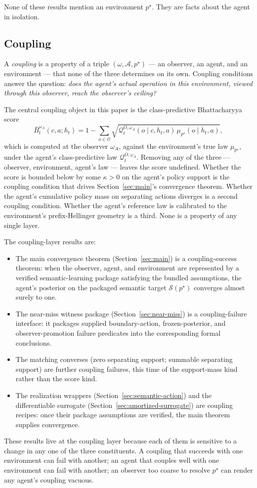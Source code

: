 \documentclass[11pt]{article}
\theoremstyle{definition}
\theoremstyle{remark}
\theoremstyle{plain}
\theoremstyle{definition}
\newcommand{\Acal}{\mathcal{A}}
\newcommand{\Ocal}{\mathcal{O}}
\newcommand{\Qcal}{\mathcal{Q}}
\newcommand{\Scal}{\mathcal{S}}
\begin{document}
None of these results mention an environment $p^\star$. They are facts about the agent in isolation.

\subsection{Coupling}
\label{sec:ontology-coupling}

A \emph{coupling} is a property of a triple $(\omega,\Acal,p^\star)$ --- an observer, an agent, and an environment --- that none of the three determines on its own. Coupling conditions answer the question: \emph{does the agent's actual operation in this environment, viewed through this observer, reach the observer's ceiling?}

The central coupling object in this paper is the class-predictive Bhattacharyya score
\[
\bar B_t^{\omega_A}(c,a;h_t)
=
1-\sum_{o\in\Ocal}\sqrt{\Qcal_t^{O,\omega_A}(o\mid c,h_t,a)\,\mu_{p^\star}(o\mid h_t,a)},
\]
which is computed at the observer $\omega_A$, against the environment's true law $\mu_{p^\star}$, under the agent's class-predictive law $\Qcal_t^{O,\omega_A}$. Removing any of the three --- observer, environment, agent's law --- leaves the score undefined. Whether the score is bounded below by some $\kappa>0$ on the agent's policy support is the coupling condition that drives Section~\ref{sec:main}'s convergence theorem. Whether the agent's cumulative policy mass on separating actions diverges is a second coupling condition. Whether the agent's reference law is calibrated to the environment's prefix-Hellinger geometry is a third. None is a property of any single layer.

The coupling-layer results are:
\begin{itemize}
\item The main convergence theorem (Section~\ref{sec:main}) is a coupling-success theorem: when the observer, agent, and environment are represented by a verified semantic-learning package satisfying the bundled assumptions, the agent's posterior on the packaged semantic target $\Scal(p^\star)$ converges almost surely to one.
\item The near-miss witness package (Section~\ref{sec:near-miss}) is a coupling-failure interface: it packages supplied boundary-action, frozen-posterior, and observer-promotion failure predicates into the corresponding formal conclusions.
\item The matching converses (zero separating support; summable separating support) are further coupling failures, this time of the support-mass kind rather than the score kind.
\item The realization wrappers (Section~\ref{sec:semantic-action}) and the differentiable surrogate (Section~\ref{sec:amortized-surrogate}) are coupling recipes: once their package assumptions are verified, the main theorem supplies convergence.
\end{itemize}
These results live at the coupling layer because each of them is sensitive to a change in any one of the three constituents. A coupling that succeeds with one environment can fail with another; an agent that couples well with one environment can fail with another; an observer too coarse to resolve $p^\star$ can render any agent's coupling vacuous.
\end{document}
